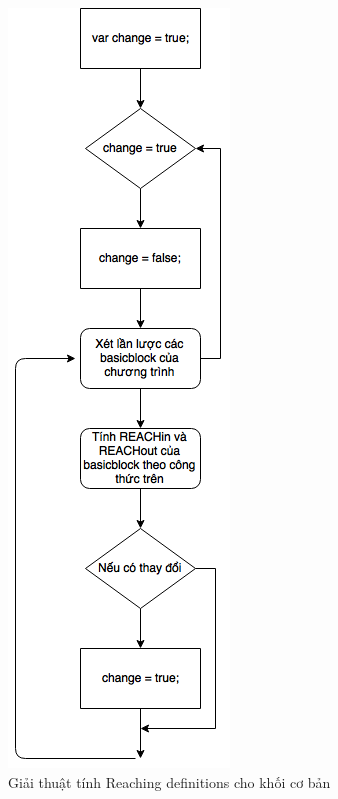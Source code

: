 \begin{figure}[h!]
	\centering
	\includegraphics[scale=0.75]{image/reachingDefAlgo}
	\caption{Giải thuật tính Reaching definitions cho khối cơ bản}
	\label{fig:reachingdefalgo}
\end{figure}


